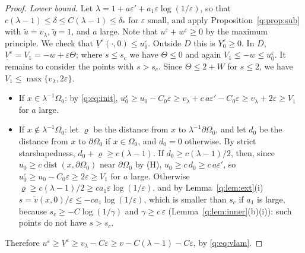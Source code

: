 \documentclass[11pt]{amsart}
\theoremstyle{definition}
\theoremstyle{remark}
\newcommand{\ve}{\varepsilon}
\begin{document}
\begin{proof}
\emph{Lower bound.} Let $\lambda=1+a\ve'+a_1\ve\log(1/\ve)$, so that
$c(\lambda-1)\le\delta\le C(\lambda-1)\le\delta_*$ for $\ve$ small, and apply
Proposition~\ref{q:prop:sub} with $\tilde u=v_\lambda$, $\tilde q=1$, and $a$ large. Note that
$u^\ve+w^\ve\ge0$ by the maximum principle. We check that
$\underline V^\ve(\cdot,0)\le u_0^\ve$. Outside $D$ this is $Y_0^\ve\ge0$. In $D$,
$\underline V^\ve=V_1=-w+\ve\Theta$; where $s\le s_c$ we have $\Theta\le0$ and again
$V_1\le-w\le u_0^\ve$. It remains to consider the points with $s>s_c$. Since
$\Theta\le2+W$ for $s\le2$, we have $V_1\le\max\{v_\lambda,2\ve\}$.
\begin{itemize}
\item If $x\in\lambda^{-1}\Omega_0$: by \eqref{q:eq:init},
$u_0^\ve\ge u_0-C_0\ve\ge v_\lambda+c\,a\ve'-C_0\ve\ge v_\lambda+2\ve\ge V_1$ for $a$ large.
\item If $x\notin\lambda^{-1}\Omega_0$: let $\varrho$ be the distance from $x$ to
$\lambda^{-1}\partial\Omega_0$, and let $d_0$ be the distance from $x$ to $\partial\Omega_0$ if
$x\in\Omega_0$, and $d_0=0$ otherwise. By strict starshapedness,
$d_0+\varrho\ge c(\lambda-1)$. If $d_0\ge c(\lambda-1)/2$, then, since
$u_0\ge c\operatorname{dist}(x,\partial\Omega_0)$ near $\partial\Omega_0$ by (H), $u_0\ge c\,d_0\ge c\,a\ve'$, so
$u_0^\ve\ge u_0-C_0\ve\ge2\ve\ge V_1$ for $a$ large. Otherwise
$\varrho\ge c(\lambda-1)/2\ge ca_1\ve\log(1/\ve)$, and by Lemma~\ref{q:lem:ext}(i)
$s=\tilde v(x,0)/\ve\le-ca_1\log(1/\ve)$, which is smaller than $s_c$ if $a_1$ is large, because
$s_c\ge-C\log(1/\gamma)$ and $\gamma\ge c\,\ve$ (Lemma~\ref{q:lem:inner}(b)(i)): such
points do not have $s>s_c$.
\end{itemize}
Therefore $u^\ve\ge\underline V^\ve\ge v_\lambda-C\ve\ge v-C(\lambda-1)-C\ve$, by
\eqref{q:eq:vlam}.
\end{proof}
\end{document}
